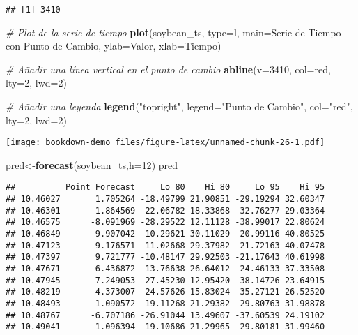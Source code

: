 \documentclass[
]{book}
\newenvironment{Shaded}{\begin{snugshade}}{\end{snugshade}}
\newcommand{\AttributeTok}[1]{\textcolor[rgb]{0.13,0.29,0.53}{#1}}
\newcommand{\CommentTok}[1]{\textcolor[rgb]{0.56,0.35,0.01}{\textit{#1}}}
\newcommand{\DecValTok}[1]{\textcolor[rgb]{0.00,0.00,0.81}{#1}}
\newcommand{\FunctionTok}[1]{\textcolor[rgb]{0.13,0.29,0.53}{\textbf{#1}}}
\newcommand{\NormalTok}[1]{#1}
\newcommand{\OtherTok}[1]{\textcolor[rgb]{0.56,0.35,0.01}{#1}}
\newcommand{\StringTok}[1]{\textcolor[rgb]{0.31,0.60,0.02}{#1}}
\begin{document}
\begin{verbatim}
## [1] 3410
\end{verbatim}

\begin{Shaded}
\begin{Highlighting}[]
\CommentTok{\# Plot de la serie de tiempo}
\FunctionTok{plot}\NormalTok{(soybean\_ts, }\AttributeTok{type=}\StringTok{\textquotesingle{}l\textquotesingle{}}\NormalTok{, }\AttributeTok{main=}\StringTok{\textquotesingle{}Serie de Tiempo con Punto de Cambio\textquotesingle{}}\NormalTok{, }\AttributeTok{ylab=}\StringTok{\textquotesingle{}Valor\textquotesingle{}}\NormalTok{, }\AttributeTok{xlab=}\StringTok{\textquotesingle{}Tiempo\textquotesingle{}}\NormalTok{)}

\CommentTok{\# Añadir una línea vertical en el punto de cambio}
\FunctionTok{abline}\NormalTok{(}\AttributeTok{v=}\DecValTok{3410}\NormalTok{, }\AttributeTok{col=}\StringTok{\textquotesingle{}red\textquotesingle{}}\NormalTok{, }\AttributeTok{lty=}\DecValTok{2}\NormalTok{, }\AttributeTok{lwd=}\DecValTok{2}\NormalTok{)}

\CommentTok{\# Añadir una leyenda}
\FunctionTok{legend}\NormalTok{(}\StringTok{"topright"}\NormalTok{, }\AttributeTok{legend=}\StringTok{"Punto de Cambio"}\NormalTok{, }\AttributeTok{col=}\StringTok{"red"}\NormalTok{, }\AttributeTok{lty=}\DecValTok{2}\NormalTok{, }\AttributeTok{lwd=}\DecValTok{2}\NormalTok{)}
\end{Highlighting}
\end{Shaded}

\texttt{[image: bookdown-demo\_files/figure-latex/unnamed-chunk-26-1.pdf]}

\begin{Shaded}
\begin{Highlighting}[]
\NormalTok{pred}\OtherTok{\textless{}{-}}\FunctionTok{forecast}\NormalTok{(soybean\_ts,}\AttributeTok{h=}\DecValTok{12}\NormalTok{)}
\NormalTok{pred}
\end{Highlighting}
\end{Shaded}

\begin{verbatim}
##          Point Forecast     Lo 80    Hi 80     Lo 95    Hi 95
## 10.46027       1.705264 -18.49799 21.90851 -29.19294 32.60347
## 10.46301      -1.864569 -22.06782 18.33868 -32.76277 29.03364
## 10.46575      -8.091969 -28.29522 12.11128 -38.99017 22.80624
## 10.46849       9.907042 -10.29621 30.11029 -20.99116 40.80525
## 10.47123       9.176571 -11.02668 29.37982 -21.72163 40.07478
## 10.47397       9.721777 -10.48147 29.92503 -21.17643 40.61998
## 10.47671       6.436872 -13.76638 26.64012 -24.46133 37.33508
## 10.47945      -7.249053 -27.45230 12.95420 -38.14726 23.64915
## 10.48219      -4.373007 -24.57626 15.83024 -35.27121 26.52520
## 10.48493       1.090572 -19.11268 21.29382 -29.80763 31.98878
## 10.48767      -6.707186 -26.91044 13.49607 -37.60539 24.19102
## 10.49041       1.096394 -19.10686 21.29965 -29.80181 31.99460
\end{verbatim}
\end{document}
